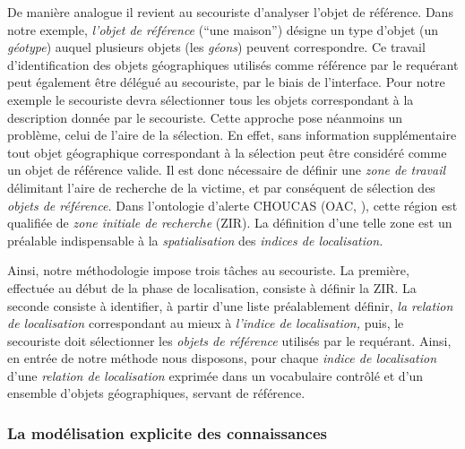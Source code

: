 De manière analogue il revient au secouriste d'analyser l'objet de
référence. Dans notre exemple, \emph{l'objet de référence}
(\enquote{une maison}) désigne un type d'objet (\ie un \emph{géotype})
auquel plusieurs objets (\ie les \emph{géons}) peuvent
correspondre. Ce travail d'identification des objets géographiques
utilisés comme référence par le requérant peut également être délégué
au secouriste, par le biais de l'interface. Pour notre exemple le
secouriste devra sélectionner tous les objets correspondant à la
description donnée par le secouriste. Cette approche pose néanmoins un
problème, celui de l'aire de la sélection. En effet, sans information
supplémentaire tout objet géographique correspondant à la sélection
peut être considéré comme un objet de référence valide. Il est donc
nécessaire de définir une \emph{zone de travail} délimitant l'aire de
recherche de la victime, et par conséquent de sélection des
\emph{objets de référence.} Dans l'ontologie d'alerte CHOUCAS (OAC,
\cite{Viry2019}), cette région est qualifiée de \emph{zone initiale de
  recherche} (ZIR). La définition d'une telle zone est un préalable
indispensable à la \emph{spatialisation} des \emph{indices de
  localisation.}

Ainsi, notre méthodologie impose trois tâches au secouriste. La
première, effectuée au début de la phase de localisation, consiste à
définir la ZIR. La seconde consiste à identifier, à partir d'une liste
préalablement définir, \emph{la relation de localisation}
correspondant au mieux à \emph{l'indice de localisation,} puis, le
secouriste doit sélectionner les \emph{objets de référence} utilisés
par le requérant.
%
Ainsi, en entrée de notre méthode nous disposons, pour chaque
\emph{indice de localisation} d'une \emph{relation de localisation}
exprimée dans un vocabulaire contrôlé et d'un ensemble d'objets
géographiques, servant de référence.



\subsubsection{La modélisation explicite des connaissances}

